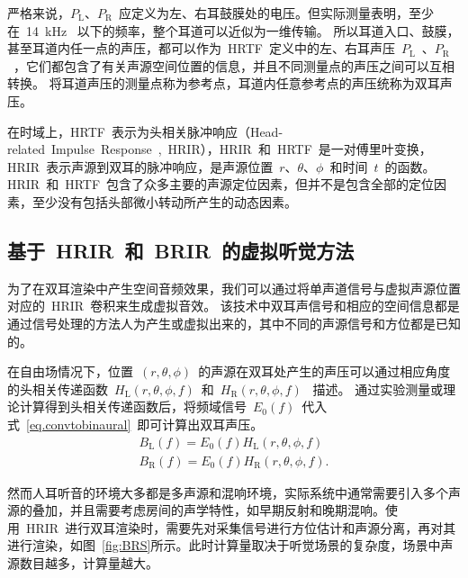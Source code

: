 严格来说，$P_{\text{L}}$、$P_{\text{R}}$~应定义为左、右耳鼓膜处的电压。但实际测量表明，至少在~14~kHz~ 以下的频率，整个耳道可以近似为一维传输。
所以耳道入口、鼓膜，甚至耳道内任一点的声压，都可以作为~HRTF~定义中的左、右耳声压~$P_{\text{L}}$~、$P_{\text{R}}$~，它们都包含了有关声源空间位置的信息，并且不同测量点的声压之间可以互相转换。
将耳道声压的测量点称为参考点，耳道内任意参考点的声压统称为双耳声压。

在时域上，HRTF~表示为头相关脉冲响应（Head-related~Impulse~Response~,~HRIR），HRIR~和~HRTF~是一对傅里叶变换，HRIR~表示声源到双耳的脉冲响应，是声源位置~$r$、$\theta$、$\phi$~和时间~$t$~的函数。HRIR~和~HRTF~包含了众多主要的声源定位因素，但并不是包含全部的定位因素，至少没有包括头部微小转动所产生的动态因素。

\subsection{基于~HRIR~和~BRIR~的虚拟听觉方法}
为了在双耳渲染中产生空间音频效果，我们可以通过将单声道信号与虚拟声源位置对应的~HRIR~卷积来生成虚拟音效。
该技术中双耳声信号和相应的空间信息都是通过信号处理的方法人为产生或虚拟出来的，其中不同的声源信号和方位都是已知的。

在自由场情况下，位置~$(r,\theta,\phi)$~的声源在双耳处产生的声压可以通过相应角度的头相关传递函数~$H_{\text{L}}(r,\theta,\phi,f)$~和~$H_{\text{R}}(r,\theta,\phi,f)$~ 描述。
通过实验测量或理论计算得到头相关传递函数后，将频域信号~$E_{0}(f)$~代入式~\eqref{eq.convtobinaural}~即可计算出双耳声压。
\begin{equation}\label{eq.convtobinaural}
\begin{split}
B_{\text{L}}(f) = E_{0}(f)H_{\text{L}}(r,\theta,\phi,f)\\
B_{\text{R}}(f) = E_{0}(f)H_{\text{R}}(r,\theta,\phi,f).
\end{split}
\end{equation}

然而人耳听音的环境大多都是多声源和混响环境，实际系统中通常需要引入多个声源的叠加，并且需要考虑房间的声学特性，如早期反射和晚期混响。使用~HRIR~进行双耳渲染时，需要先对采集信号进行方位估计和声源分离，再对其进行渲染，如图~\ref{fig:BRS}所示。此时计算量取决于听觉场景的复杂度，场景中声源数目越多，计算量越大。

